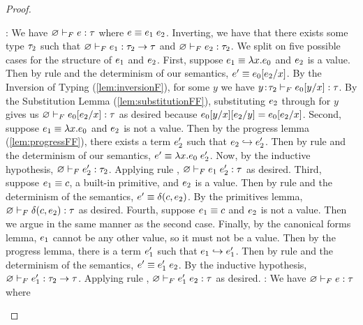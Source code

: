 \begin{proof}
  \begin{itemize}
  \pfcase{\fApp}: We have 
  $\hasftype{\varnothing}{\sexpr}{\sftype}$ where
  $\sexpr \equiv \app{\sexpr_1}{\sexpr_2}$. 
  Inverting, we have that there exists some type $\sftype_2$
  such that $\hasftype{\varnothing}{\sexpr_1}{\funcftype{\sftype_2}{\sftype}}$
  and $\hasftype{\varnothing}{\sexpr_2}{\sftype_2}$.
  We split on five possible cases for 
  the structure of $\sexpr_1$ and $\sexpr_2$. 
  First, suppose $\sexpr_1 \equiv \vabs{x}{\sexpr_0}$ and $\sexpr_2$ is 
  a value. Then by rule \eAppAbs and the determinism of our semantics, 
  $e' \equiv \subst{\sexpr_0}{x}{\sexpr_2}$.
  By the Inversion of Typing (\ref{lem:inversionF}), for some $y$ we have
  $\hasftype{\bind{y}{\sftype_2}}{\subst{\sexpr_0}{x}{y}}{\sftype}$.
  By the Substitution Lemma (\ref{lem:substitutionFF}), 
  substituting $\sexpr_2$ through for $y$
  gives us $\hasftype{\varnothing}{\subst{\sexpr_0}{x}{\sexpr_2}}{\sftype}$
  as desired because $\subst{\subst{\sexpr_0}{x}{y}}{y}{\sexpr_2} = \subst{\sexpr_0}{x}{\sexpr_2}$.
  Second, suppose $\sexpr_1 \equiv \vabs{x}{\sexpr_0}$ and $\sexpr_2$
  is not a value. Then by the progress lemma (\ref{lem:progressFF}), 
  there exists a term
  $\sexpr'_2$ such that $\sexpr_2 \step \sexpr'_2$. Then by rule \eAppV
  and the determinism of our semantics,
  $e' \equiv \app{\vabs{x}{\sexpr_0}}{\sexpr'_2}$. 
  Now, by the inductive hypothesis, 
  $\hasftype{\varnothing}{\sexpr'_2}{\sftype_2}$.
  Applying rule \fApp, 
  $\hasftype{\varnothing}{\app{\sexpr_1}{\sexpr'_2}}{\sftype}$
  as desired.
  Third, suppose $\sexpr_1 \equiv \sconst$, a built-in primitive, 
  and $\sexpr_2$ is a value. Then by rule \ePrim
  and the determinism of the semantics, 
  $e' \equiv \delta(\sconst,\sexpr_2)$.
  By the primitives lemma, 
  $\hasftype{\varnothing}{\delta(\sconst,\sexpr_2)}{\sftype}$ as desired.
  Fourth, suppose $\sexpr_1 \equiv \sconst$ and $\sexpr_2$
  is not a value. Then we argue in the same manner as the second case.
  Finally, by the canonical forms lemma, $\sexpr_1$ cannot be any other
  value, so it must not be a value. Then by the progress lemma,
  there is a term $\sexpr'_1$ such that $\sexpr_1 \step \sexpr'_1$. 
  Then by rule \eApp and the determinism of the semantics,
  $e' \equiv \app{\sexpr'_1}{\sexpr_2}$. By the inductive hypothesis,
  $\hasftype{\varnothing}{\sexpr'_1}{\funcftype{\sftype_2}{\sftype}}$.
  Applying rule \fApp, $\hasftype{\varnothing}{\app{\sexpr'_1}{\sexpr_2}}{\sftype}$
  as desired.
  \pfcase{\fTApp}: We have 
  $\hasftype{\varnothing}{\sexpr}{\sftype}$ where

\end{itemize}
\end{proof}
